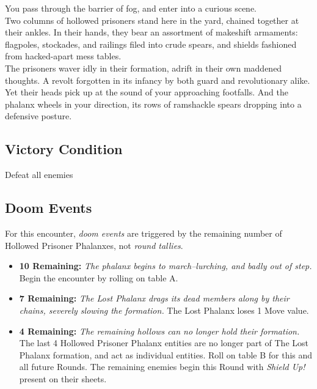 You pass through the barrier of fog, and enter into a curious scene.\\

Two columns of hollowed prisoners stand here in the yard, chained together at their ankles. In their hands, they bear an assortment of makeshift armaments: flagpoles, stockades, and railings filed into crude spears, and shields fashioned from hacked-apart mess tables.\\

The prisoners waver idly in their formation, adrift in their own maddened thoughts. A revolt forgotten in its infancy by both guard and revolutionary alike. Yet their heads pick up at the sound of your approaching footfalls. And the phalanx wheels in your direction, its rows of ramshackle spears dropping into a defensive posture.

\subsection*{Victory Condition}
Defeat all enemies

\subsection*{Doom Events}
For this encounter, \emph{doom events} are triggered by the remaining number of Hollowed Prisoner Phalanxes, not \emph{round tallies}.

\begin{itemize}
\item \textbf{10 Remaining:} \emph{The phalanx begins to march--lurching, and badly out of step.} Begin the encounter by rolling on table A.
\item \textbf{7 Remaining:} \emph{The Lost Phalanx drags its dead members along by their chains, severely slowing the formation.} The Lost Phalanx loses 1 Move value.
\item \textbf{4 Remaining:} \emph{The remaining hollows can no longer hold their formation.} The last 4 Hollowed Prisoner Phalanx entities are no longer part of The Lost Phalanx formation, and act as individual entities. Roll on table B for this and all future Rounds. The remaining enemies begin this Round with \emph{Shield Up!} present on their sheets.
\end{itemize}

\pagebreak

